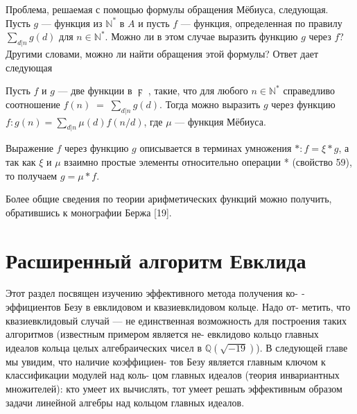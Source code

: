 Проблема, решаемая с помощью формулы обращения Мёбиуса, следующая. Пусть $g$ — функция из $\mathbb{N}^*$ в $A$ и пусть $f$ — функция, определенная по правилу $\sum\nolimits_{d|n}g(d)$ для $n\in\mathbb{N}^*$. Можно ли в этом случае выразить функцию $g$ через $f$? Другими словами, можно ли найти обращения этой формулы? Ответ дает следующая
\begin{thm}
\hspace{0.5cm}Пусть $f$ и $g$ — две функции в $\digamma$ , такие, что для любого $n\in\mathbb{N}^*$ справедливо соотношение $f(n)\;=\;\sum\nolimits_{d|n}g(d)$. Тогда можно выразить $g$
через функцию $f: g(n)=\sum\nolimits_{d|n}\mu(d)f(n/d)$, где $\mu$ — функция Мёбиуса.
\end{thm}
\newpage
\begin{myproof}
Выражение $f$ через функцию $g$ описывается в терминах умножения
$*: f = \xi*g$, а так как $\xi$ и $\mu$ взаимно простые элементы относительно
 операции * (свойство 59), то получаем $g= \mu*f$.
\end{myproof}

Более общие сведения по теории арифметических функций можно
получить, обратившись к монографии Бержа [19].
\section{Расширенный алгоритм Евклида}
\noindent Этот раздел посвящен изучению эффективного метода получения ко-\linebreak
­эффициентов Безу в евклидовом и квазиевклидовом кольце. Надо от­-\linebreak
метить, что квазиевклидовый случай — не единственная возможность\linebreak
для построения таких алгоритмов (известным примером является не-\linebreak
­евклидово кольцо главных идеалов кольца целых алгебраических чисел\linebreak
в $\mathbb{Q}(\sqrt{-19})$). В следующей главе мы увидим, что наличие коэффициен-\linebreak
­тов Безу является главным ключом к классификации модулей над коль-\linebreak
цом главных идеалов (теория инвариантных множителей): кто умеет их\linebreak
вычислять, тот умеет решать эффективным образом задачи линейной\linebreak
алгебры над кольцом главных идеалов.

